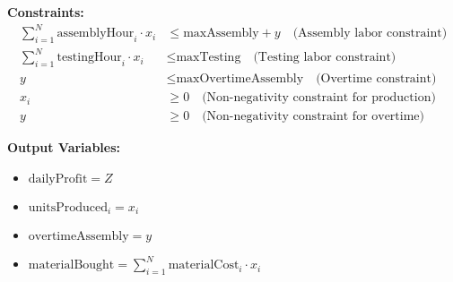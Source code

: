 \documentclass{article}
\begin{document}
\textbf{Constraints:}
\begin{align*}
\sum_{i=1}^{N} \text{assemblyHour}_i \cdot x_i & \leq \text{maxAssembly} + y \quad \text{(Assembly labor constraint)} \\
\sum_{i=1}^{N} \text{testingHour}_i \cdot x_i & \leq \text{maxTesting} \quad \text{(Testing labor constraint)} \\
y & \leq \text{maxOvertimeAssembly} \quad \text{(Overtime constraint)} \\
x_i & \geq 0 \quad \text{(Non-negativity constraint for production)} \\
y & \geq 0 \quad \text{(Non-negativity constraint for overtime)}
\end{align*}

\textbf{Output Variables:}
\begin{itemize}
    \item \( \text{dailyProfit} = Z \)
    \item \( \text{unitsProduced}_i = x_i \)
    \item \( \text{overtimeAssembly} = y \)
    \item \( \text{materialBought} = \sum_{i=1}^{N} \text{materialCost}_i \cdot x_i \)
\end{itemize}
\end{document}
